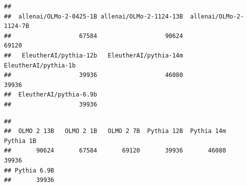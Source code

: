 \documentclass[
]{article}
\newenvironment{Shaded}{\begin{snugshade}}{\end{snugshade}}
\newcommand{\FunctionTok}[1]{\textcolor[rgb]{0.13,0.29,0.53}{\textbf{#1}}}
\newcommand{\NormalTok}[1]{#1}
\newcommand{\SpecialCharTok}[1]{\textcolor[rgb]{0.81,0.36,0.00}{\textbf{#1}}}
\begin{document}
\begin{verbatim}
## 
##  allenai/OLMo-2-0425-1B allenai/OLMo-2-1124-13B  allenai/OLMo-2-1124-7B 
##                   67584                   90624                   69120 
##   EleutherAI/pythia-12b   EleutherAI/pythia-14m    EleutherAI/pythia-1b 
##                   39936                   46080                   39936 
##  EleutherAI/pythia-6.9b 
##                   39936
\end{verbatim}

\begin{Shaded}
\end{Shaded}

\begin{verbatim}
## 
##  OLMO 2 13B   OLMO 2 1B   OLMO 2 7B  Pythia 12B  Pythia 14m   Pythia 1B 
##       90624       67584       69120       39936       46080       39936 
## Pythia 6.9B 
##       39936
\end{verbatim}

\begin{Shaded}
\end{Shaded}
\end{document}
